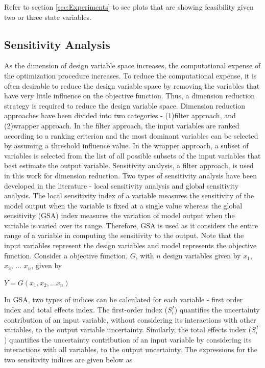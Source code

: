 \documentclass[10pt]{article}
\begin{document}
Refer to section \ref{sec:Experiments} to see plots that are showing feasibility given two or three state variables.

\subsection{Sensitivity Analysis}
\label{sec:Sensitivity}
\hspace{5 mm} As the dimension of design variable space increases, the computational expense of the optimization procedure increases. To reduce the computational expense, it is often desirable to reduce the design variable space by removing the variables that have very little influence on the objective function. Thus, a dimension reduction strategy is required to reduce the design variable space. Dimension reduction approaches have been divided into two categories - (1)filter approach, and (2)wrapper approach. In the filter approach, the input variables are ranked according to a ranking criterion and the most dominant variables can be selected by assuming a threshold influence value. In the wrapper approach, a subset of variables is selected from the list of all possible subsets of the input variables that best estimate the output variable. Sensitivity analysis, a filter approach, is used in this work for dimension reduction. Two types of sensitivity analysis have been developed in the literature - local sensitivity analysis and global sensitivity analysis. The local sensitivity index of a variable measures the sensitivity of the model output when the variable is fixed at a single value whereas the global sensitivity (GSA) index measures the variation of model output when the variable is varied over its range. Therefore, GSA is used as it considers the entire range of a variable in computing the sensitivity to the output. Note that the input variables represent the design variables and model represents the objective function.
Consider a objective function, $G$, with $n$ design variables given by $x_{1}$, $x_{2}$, ...  $x_{n}$, given by

\centerline{$Y = G(x_{1}, x_{2}, ... x_{n})$}

In GSA, two types of indices can be calculated for each variable - first order index and total effects index. The first-order index ($S_{i}^{I}$) quantifies the uncertainty contribution of an input variable, without considering its interactions with other variables, to the output variable uncertainty. Similarly, the total effects index ($S_{i}^{T}$) quantifies the uncertainty contribution of an input variable by considering its interactions with all variables, to the output uncertainty. The expressions for the two sensitivity indices are given below as 
\end{document}
